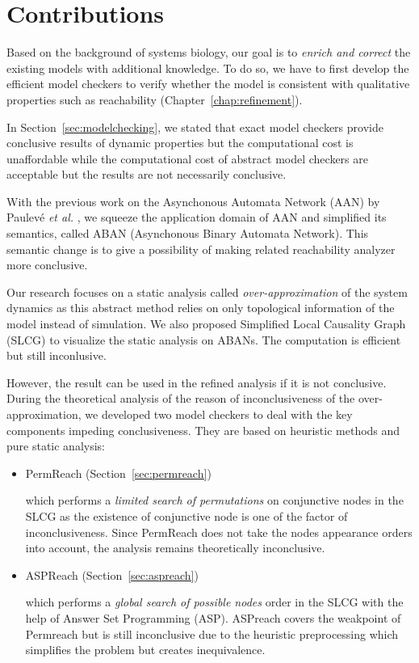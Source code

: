 \section{Contributions}

Based on the background of systems biology, our goal is to \textit{enrich and correct} the existing models with additional knowledge.
To do so, we have to first develop the efficient model checkers to verify whether the model is consistent with qualitative properties such as reachability (Chapter~\ref{chap:refinement}).

In Section~\ref{sec:modelchecking}, we stated that exact model checkers provide conclusive results of dynamic properties but the computational cost is unaffordable while the computational cost of abstract model checkers are acceptable but the results are not necessarily conclusive.

With the previous work on the Asynchonous Automata Network (AAN) by Paulev\'e \textit{et al.} \cite{folschette2015},
we squeeze the application domain of AAN and simplified its semantics, called ABAN (Asynchonous Binary Automata Network).
This semantic change is to give a possibility of making related reachability analyzer more conclusive.

Our research focuses on a static analysis called \textit{over-approximation} of the system dynamics as this abstract method relies on only topological information of the model instead of simulation.
We also proposed Simplified Local Causality Graph (SLCG) to visualize the static analysis on ABANs.
The computation is efficient but still inconlusive.

However, the result can be used in the refined analysis if it is not conclusive.
During the theoretical analysis of the reason of inconclusiveness of the over-approximation, we developed two model checkers to deal with the key components impeding conclusiveness.
They are based on heuristic methods and pure static analysis:
\begin{itemize}
    \item PermReach (Section~\ref{sec:permreach})
    
        which performs a \textit{limited search of permutations} on conjunctive nodes in the SLCG as the existence of conjunctive node is one of the factor of inconclusiveness.
        Since PermReach does not take the nodes appearance orders into account, the analysis remains theoretically inconclusive.
    \item ASPReach (Section~\ref{sec:aspreach})
        
        which performs a \textit{global search of possible nodes} order in the SLCG with the help of Answer Set Programming (ASP).
        ASPreach covers the weakpoint of Permreach but is still inconclusive due to the heuristic preprocessing which simplifies the problem but creates inequivalence.
\end{itemize}

